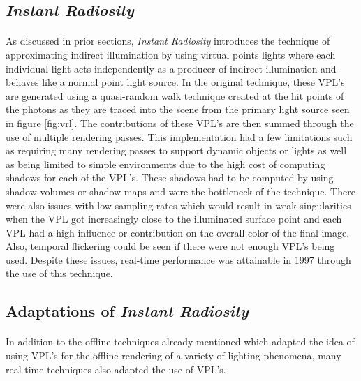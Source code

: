 \subsection{\textit{Instant Radiosity}} \label{sec:instantradiosity}
\paragraph{}
As discussed in prior sections, \textit{Instant Radiosity} introduces the technique of approximating indirect illumination by using virtual points lights where each individual light acts independently as a producer of indirect illumination and behaves like a normal point light source.  In the original technique, these VPL's are generated using a quasi-random walk technique created at the hit points of the photons as they are traced into the scene from the primary light source seen in figure \ref{fig:vrl}.  The contributions of these VPL's are then summed through the use of multiple rendering passes.  This implementation had a few limitations such as requiring many rendering passes to support dynamic objects or lights as well as being limited to simple environments due to the high cost of computing shadows for each of the VPL's.  These shadows had to be computed by using shadow volumes or shadow maps and were the bottleneck of the technique.  There were also issues with low sampling rates which would result in weak singularities when the VPL got increasingly close to the illuminated surface point and each VPL had a high influence or contribution on the overall color of the final image.  Also, temporal flickering could be seen if there were not enough VPL's being used.  Despite these issues, real-time performance was attainable in 1997 through the use of this technique.

\subsection{Adaptations of \textit{Instant Radiosity}}
\paragraph{}
In addition to the offline techniques already mentioned which adapted the idea of using VPL's for the offline rendering of a variety of lighting phenomena, many real-time techniques also adapted the use of VPL's.

